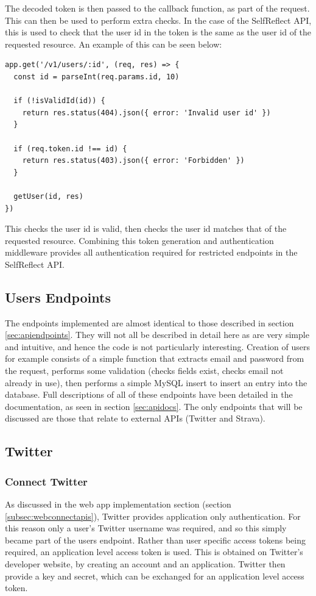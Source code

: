 \documentclass[11pt,openright,a4paper]{report}
\begin{document}
The decoded token is then passed to the callback function, as part of the request. This can then be used to perform extra checks. In the case of the SelfReflect API, this is used to check that the user id in the token is the same as the user id of the requested resource. An example of this can be seen below:
\begin{lstlisting}
app.get('/v1/users/:id', (req, res) => {
  const id = parseInt(req.params.id, 10)

  if (!isValidId(id)) {
    return res.status(404).json({ error: 'Invalid user id' })
  }

  if (req.token.id !== id) {
    return res.status(403).json({ error: 'Forbidden' })
  }

  getUser(id, res)
})
\end{lstlisting}

This checks the user id is valid, then checks the user id matches that of the requested resource. Combining this token generation and authentication middleware provides all authentication required for restricted endpoints in the SelfReflect API.

\subsection{Users Endpoints} \label{sec:apiimplusers}
The endpoints implemented are almost identical to those described in section \ref{sec:apiendpoints}. They will not all be described in detail here as are very simple and intuitive, and hence the code is not particularly interesting. Creation of users for example consists of a simple function that extracts email and password from the request, performs some validation (checks fields exist, checks email not already in use), then performs a simple MySQL insert to insert an entry into the database. Full descriptions of all of these endpoints have been detailed in the documentation, as seen in section \ref{sec:apidocs}. The only endpoints that will be discussed are those that relate to external APIs (Twitter and Strava).

\subsection{Twitter} \label{sec:apiconnecttwitter}
\subsubsection{Connect Twitter}
As discussed in the web app implementation section (section \ref{subsec:webconnectapis}), Twitter provides application only authentication. For this reason only a user's Twitter username was required, and so this simply became part of the users endpoint. Rather than user specific access tokens being required, an application level access token is used. This is obtained on Twitter's developer website, by creating an account and an application. Twitter then provide a key and secret, which can be exchanged for an application level access token.
\end{document}

